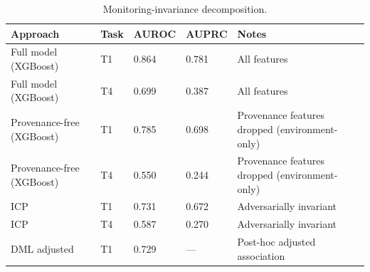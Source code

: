 \begin{table}
\caption{Monitoring-invariance decomposition.}
\label{tab:monitoring_invariance_main}
\begin{tabular}{lllll}
\toprule
Approach & Task & AUROC & AUPRC & Notes \\
\midrule
Full model (XGBoost) & T1 & 0.864 & 0.781 & All features \\
Full model (XGBoost) & T4 & 0.699 & 0.387 & All features \\
Provenance-free (XGBoost) & T1 & 0.785 & 0.698 & Provenance features dropped (environment-only) \\
Provenance-free (XGBoost) & T4 & 0.550 & 0.244 & Provenance features dropped (environment-only) \\
ICP & T1 & 0.731 & 0.672 & Adversarially invariant \\
ICP & T4 & 0.587 & 0.270 & Adversarially invariant \\
DML adjusted & T1 & 0.729 & — & Post-hoc adjusted association \\
\bottomrule
\end{tabular}
\end{table}
